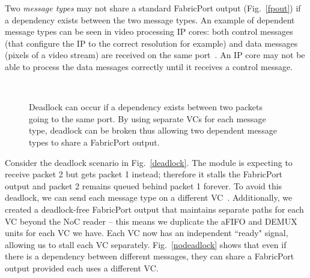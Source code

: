 Two \textit{message types} may not share a standard FabricPort output (Fig.~\ref{fpout}) if a dependency exists between the two message types.
An example of dependent message types can be seen in video processing IP cores: both control messages (that configure the IP to the correct resolution for example) and data messages (pixels of a video stream) are received on the same port~\cite{altera_vip}.
An IP core may not be able to process the data messages correctly until it receives a control message.


\begin{figure}[t]
\centering
{}
 \\
\caption{Deadlock can occur if a dependency exists between two packets going to the same port. By using separate VCs for each message type, deadlock can be broken thus allowing two dependent message types to share a FabricPort output.}
\label{dead}
\end{figure}

Consider the deadlock scenario in Fig.~\ref{deadlock}.
The module is expecting to receive packet 2 but gets packet 1 instead; therefore it stalls the FabricPort output and packet 2 remains queued behind packet 1 forever.
To avoid this deadlock, we can send each message type on a different VC~\cite{Sorin2011}.
Additionally, we created a deadlock-free FabricPort output that maintains separate paths for each VC beyond the NoC reader -- this means we duplicate the aFIFO and DEMUX units for each VC we have.
Each VC now has an independent ``ready" signal, allowing us to stall each VC separately.
Fig.~\ref{nodeadlock} shows that even if there is a dependency between different messages, they can share a FabricPort output provided each uses a different VC.

